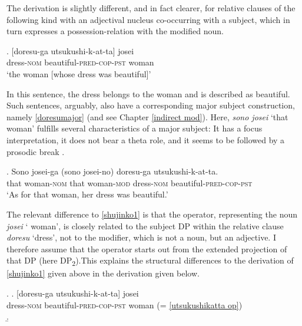 \documentclass [output=book,colorlinks,citecolor=brown]{langscibook}
\begin{document}
The derivation is slightly different, and in fact clearer, for relative clauses of the following kind with an adjectival nucleus co-occurring with a subject, which in turn expresses a possession-relation with the modified noun.

\exg. [doresu-ga utsukushi-k-at-ta] josei\\
dress-\textsc{nom} beautiful-\textsc{pred-cop-pst} woman\\
`the woman [whose dress was beautiful]’ \label{utsukushikatta op}

In this sentence, the dress belongs to the woman and is described as beautiful. Such sentences, arguably, also have a corresponding major subject construction, namely \ref{doresumajor} (and see Chapter \ref{indirect mod}). Here, \textit{sono josei} `that woman' fulfills several characteristics of a major subject: It has a focus interpretation, it does not bear a theta role, and it seems to be followed by a prosodic break \citep[1346–1348]{vermeulen:2005:poss}.

\exg. Sono josei-ga (sono josei-no) doresu-ga utsukushi-k-at-ta.\\
that woman-\textsc{nom} that woman-\textsc{mod} dress-\textsc{nom} beautiful-\textsc{pred-cop-pst}\\
`As for that woman, her dress was beautiful.’ \label{doresumajor}

The relevant difference to \ref{shujinko1} is that the operator, representing the noun \textit{josei} ` woman’, is closely related to the subject DP within the relative clause \textit{doresu} `dress’, not to the modifier, which is not a noun, but an adjective. I therefore assume that the operator starts out from the extended projection of that DP (here DP\textsubscript{2}).This explains the structural differences to the derivation of \ref{shujinko1} given above in the derivation given below.

\newpage

\ex. \ag. [doresu-ga utsukushi-k-at-ta] josei\\
dress-\textsc{nom} beautiful-\textsc{pred-cop-pst} woman (= \ref{utsukushikatta op})\\
\b. \hspace{-5cm} 
\end{document}
